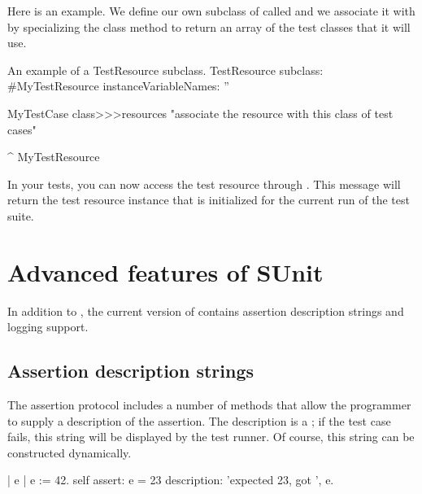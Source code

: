\documentclass[a4paper,10pt,twoside]{book}
\begin{document}
Here is an example.
We define our own subclass of  called  and we associate it with  by specializing the class method  to return an array of the test classes that it will use.

\begin{classdef}[mytestresource]{An example of a TestResource subclass.}
TestResource subclass: #MyTestResource
	instanceVariableNames: ''

MyTestCase class>>>resources
	"associate the resource with this class of test cases"

	^ {MyTestResource}
\end{classdef}

In your tests, you can now access the test resource through .
This message will return the test resource instance that is initialized for the current run of the test suite.





\section{Advanced features of SUnit}
In addition to , the current version of \sunit contains assertion description strings and logging support.

\subsection{Assertion description strings}
\label{sec:descriptionStrings}

The  assertion protocol includes a number of methods that allow the programmer to supply a description of the assertion.
The description is a ; if the test case fails, this string will be displayed by the test runner.
Of course, this string can be constructed dynamically.
\begin{code}{}
| e |
e := 42.
self
  assert: e = 23
  description: 'expected 23, got ', e.
\end{code}
\end{document}
